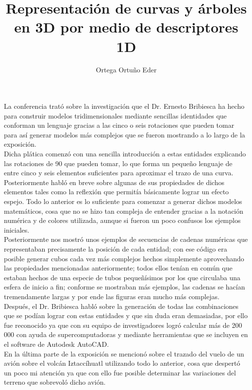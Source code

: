 \documentclass{article}
\title{Representación de curvas y árboles en 3D por medio de descriptores 1D}
\author{Ortega Ortu\~no Eder}
\date{} %
\begin{document}
	\maketitle
	\normalsize{
La conferencia trató sobre la investigación que el Dr. Ernesto Bribiesca ha hecho para construir modelos tridimensionales mediante sencillas identidades que conforman un lenguaje gracias a las cinco o seis rotaciones que pueden tomar para así generar modelos más complejos que se fueron mostrando a lo largo de la exposición.
\\

Dicha plática comenzó con una sencilla introducción a estas entidades explicando las rotaciones de 90 que pueden tomar, lo que forma un pequeño lenguaje de entre cinco y seis elementos suficientes para aproximar el trazo de una curva. Posteriormente habló en breve sobre algunas de sus propiedades de dichos elementos tales como la reflexión que permitía básicamente lograr un efecto espejo. Todo lo anterior es lo suficiente para comenzar a generar dichos modelos matemáticos, cosa que no se hizo tan compleja de entender gracias a la notación numérica y de colores utilizada, aunque si fueron un poco confusos los ejemplos iniciales.
\\

Posteriormente nos mostró unos ejemplos de secuencias de cadenas numéricas que representaban precisamente la posición de cada entidad; con ese código era posible generar cubos cada vez más complejos hechos simplemente aprovechando las propiedades mencionadas anteriormente; todos ellos tenían en común que estaban hechos de una especie de tubos pequeñísimos por los que circulaba una esfera de inicio a fin; conforme se mostraban más ejemplos, las cadenas se hacían tremendamente largas y por ende las figuras eran mucho más complejas.
\\

Después, el Dr. Bribiesca habló sobre la generación de todas las combinaciones que se podían lograr con estas entidades y que sin duda eran demasiadas, por ello fue reconocido ya que con su equipo de investigadores logró calcular más de 200 000 con ayuda de supercomputadoras y mediante herramientas que se incluyen en el software de Autodesk AutoCAD.
\\

En la última parte de la exposición se mencionó sobre el trazado del vuelo de un avión sobre el volcán Iztaccíhuatl utilizando todo lo anterior, cosa que despertó un poco mi atención ya que con ello fue posible determinar las variaciones del terreno que sobrevoló dicho avión.
\\

}
\end{document}
